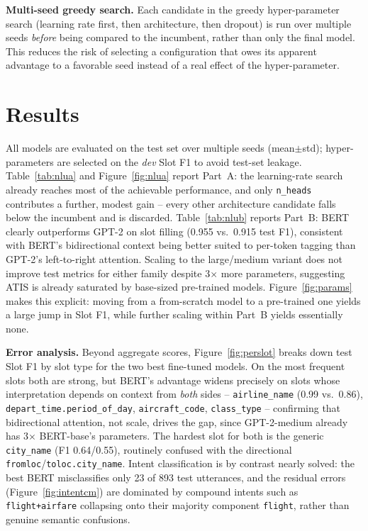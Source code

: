 \documentclass[a4paper]{article}
\begin{document}
\textbf{Multi-seed greedy search.} Each candidate in the greedy
hyper-parameter search (learning rate first, then architecture, then
dropout) is run over multiple seeds \emph{before} being compared to the
incumbent, rather than only the final model. This reduces the risk of
selecting a configuration that owes its apparent advantage to a favorable
seed instead of a real effect of the hyper-parameter.

\section{Results}
All models are evaluated on the test set over multiple seeds (mean$\pm$std);
hyper-parameters are selected on the \emph{dev} Slot F1 to avoid test-set
leakage. Table~\ref{tab:nlua} and Figure~\ref{fig:nlua} report Part~A: the
learning-rate search already reaches most of the achievable performance, and
only \texttt{n\_heads} contributes a further, modest gain -- every other
architecture candidate falls below the incumbent and is discarded. Table~\ref{tab:nlub}
reports Part~B: BERT clearly outperforms GPT-2 on slot filling (0.955 vs.\
0.915 test F1), consistent with BERT's bidirectional context being better
suited to per-token tagging than GPT-2's left-to-right attention. Scaling to
the large/medium variant does not improve test metrics for either family
despite 3$\times$ more parameters, suggesting ATIS is already saturated by
base-sized pre-trained models. Figure~\ref{fig:params} makes this explicit:
moving from a from-scratch model to a pre-trained one yields a large jump in
Slot F1, while further scaling within Part~B yields essentially none.

\textbf{Error analysis.} Beyond aggregate scores, Figure~\ref{fig:perslot}
breaks down test Slot F1 by slot type for the two best fine-tuned models. On
the most frequent slots both are strong, but BERT's advantage widens precisely
on slots whose interpretation depends on context from \emph{both} sides --
\texttt{airline\_name} (0.99 vs.\ 0.86), \texttt{depart\_time.period\_of\_day},
\texttt{aircraft\_code}, \texttt{class\_type} -- confirming that bidirectional
attention, not scale, drives the gap, since GPT-2-medium already has 3$\times$
BERT-base's parameters. The hardest slot for both is the generic
\texttt{city\_name} (F1 0.64/0.55), routinely confused with the directional
\texttt{fromloc}/\texttt{toloc.city\_name}. Intent classification is by contrast
nearly solved: the best BERT misclassifies only 23 of 893 test utterances, and
the residual errors (Figure~\ref{fig:intentcm}) are dominated by compound
intents such as \texttt{flight+airfare} collapsing onto their majority
component \texttt{flight}, rather than genuine semantic confusions.
\end{document}
